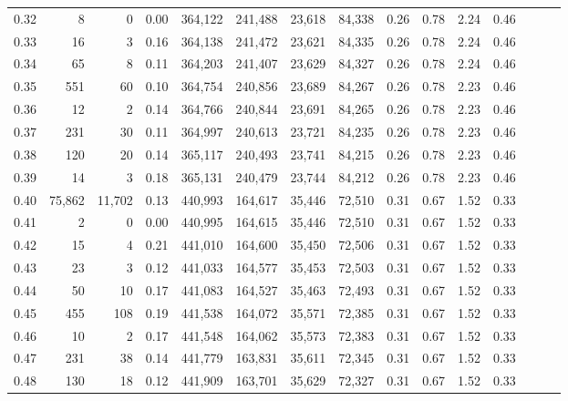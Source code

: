 \begin{tabular}{rrrrrrrrrrrrrrr}
0.32 &       8 &       0 &  0.00 &  364,122 &  241,488 &   23,618 &   84,338 &  0.26 &  0.78 &  2.24 &      0.46 \\
0.33 &      16 &       3 &  0.16 &  364,138 &  241,472 &   23,621 &   84,335 &  0.26 &  0.78 &  2.24 &      0.46 \\
0.34 &      65 &       8 &  0.11 &  364,203 &  241,407 &   23,629 &   84,327 &  0.26 &  0.78 &  2.24 &      0.46 \\
0.35 &     551 &      60 &  0.10 &  364,754 &  240,856 &   23,689 &   84,267 &  0.26 &  0.78 &  2.23 &      0.46 \\
0.36 &      12 &       2 &  0.14 &  364,766 &  240,844 &   23,691 &   84,265 &  0.26 &  0.78 &  2.23 &      0.46 \\
0.37 &     231 &      30 &  0.11 &  364,997 &  240,613 &   23,721 &   84,235 &  0.26 &  0.78 &  2.23 &      0.46 \\
0.38 &     120 &      20 &  0.14 &  365,117 &  240,493 &   23,741 &   84,215 &  0.26 &  0.78 &  2.23 &      0.46 \\
0.39 &      14 &       3 &  0.18 &  365,131 &  240,479 &   23,744 &   84,212 &  0.26 &  0.78 &  2.23 &      0.46 \\
0.40 &  75,862 &  11,702 &  0.13 &  440,993 &  164,617 &   35,446 &   72,510 &  0.31 &  0.67 &  1.52 &      0.33 \\
0.41 &       2 &       0 &  0.00 &  440,995 &  164,615 &   35,446 &   72,510 &  0.31 &  0.67 &  1.52 &      0.33 \\
0.42 &      15 &       4 &  0.21 &  441,010 &  164,600 &   35,450 &   72,506 &  0.31 &  0.67 &  1.52 &      0.33 \\
0.43 &      23 &       3 &  0.12 &  441,033 &  164,577 &   35,453 &   72,503 &  0.31 &  0.67 &  1.52 &      0.33 \\
0.44 &      50 &      10 &  0.17 &  441,083 &  164,527 &   35,463 &   72,493 &  0.31 &  0.67 &  1.52 &      0.33 \\
0.45 &     455 &     108 &  0.19 &  441,538 &  164,072 &   35,571 &   72,385 &  0.31 &  0.67 &  1.52 &      0.33 \\
0.46 &      10 &       2 &  0.17 &  441,548 &  164,062 &   35,573 &   72,383 &  0.31 &  0.67 &  1.52 &      0.33 \\
0.47 &     231 &      38 &  0.14 &  441,779 &  163,831 &   35,611 &   72,345 &  0.31 &  0.67 &  1.52 &      0.33 \\
0.48 &     130 &      18 &  0.12 &  441,909 &  163,701 &   35,629 &   72,327 &  0.31 &  0.67 &  1.52 &      0.33 \\

\end{tabular}
